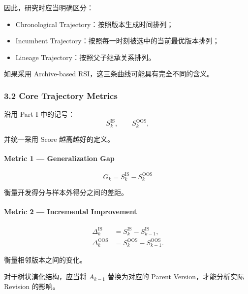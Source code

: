 因此，研究时应当明确区分：

\begin{itemize}
\tightlist
\item
  Chronological Trajectory：按照版本生成时间排列；
\item
  Incumbent Trajectory：按照每一时刻被选中的当前最优版本排列；
\item
  Lineage Trajectory：按照父子继承关系排列。
\end{itemize}

如果采用 Archive-based RSI，这三条曲线可能具有完全不同的含义。

\hypertarget{part-3-48-0001-core-trajectory-metrics}{%
\subsubsection{3.2 Core Trajectory Metrics}\label{part-3-48-0001-core-trajectory-metrics}}

沿用 Part I 中的记号：
\[S_k^{\mathrm{IS}},
\qquad
S_k^{\mathrm{OOS}},\]

并统一采用 Score 越高越好的定义。

\hypertarget{part-3-48-0001-metric-1-generalization-gap}{%
\paragraph{Metric 1 --- Generalization Gap}\label{part-3-48-0001-metric-1-generalization-gap}}

\[\boxed{
G_k=S_k^{\mathrm{IS}}-S_k^{\mathrm{OOS}}
}\]

衡量开发得分与样本外得分之间的差距。

\hypertarget{part-3-48-0001-metric-2-incremental-improvement}{%
\paragraph{Metric 2 --- Incremental Improvement}\label{part-3-48-0001-metric-2-incremental-improvement}}

\[\begin{aligned}
\Delta_k^{\mathrm{IS}}
&=S_k^{\mathrm{IS}}-S_{k-1}^{\mathrm{IS}},\\
\Delta_k^{\mathrm{OOS}}
&=S_k^{\mathrm{OOS}}-S_{k-1}^{\mathrm{OOS}}.
\end{aligned}\]

衡量相邻版本之间的变化。

对于树状演化结构，应当将 \(A_{k-1}\) 替换为对应的 Parent Version，才能分析实际 Revision 的影响。

